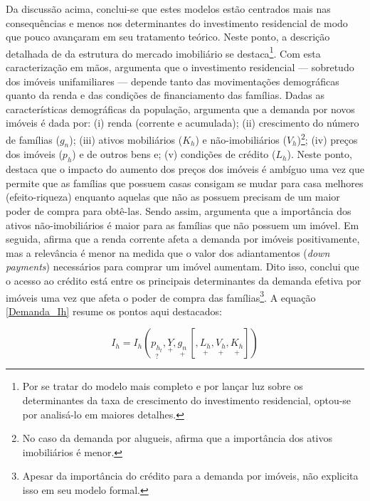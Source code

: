 Da discussão acima, 
conclui-se que estes modelos estão centrados mais nas consequências e menos nos determinantes do investimento residencial de modo que pouco avançaram em seu tratamento teórico.
Neste ponto, a descrição detalhada de \textcite{duesenberry_investment_1958} da estrutura do mercado imobiliário se destaca\footnote{
	Por se tratar do modelo mais completo e por lançar luz sobre os determinantes da taxa de crescimento do investimento residencial, optou-se por analisá-lo em maiores detalhes.
}.
Com esta caracterização em mãos, argumenta que o investimento residencial --- sobretudo dos imóveis unifamiliares --- depende tanto das movimentações demográficas quanto da renda e das condições de financiamento das famílias.
Dadas as características demográficas da população, argumenta que a demanda por novos imóveis é dada por:
	(i) renda (corrente e acumulada);
	(ii) crescimento do número de famílias ($g_n$);
	(iii) ativos mobiliários ($K_h$) e não-imobiliários ($V_h$)\footnote{No caso da demanda por alugueis, \textcite{duesenberry_investment_1958} afirma que a importância dos ativos imobiliários é menor.};
	(iv) preços dos imóveis ($p_h$) e de outros bens e;
	(v) condições de crédito ($L_h$).
Neste ponto, \textcite{duesenberry_investment_1958} destaca que o impacto do aumento dos preços dos imóveis é ambíguo uma vez que permite que as famílias que possuem casas consigam se mudar para casa melhores (efeito-riqueza) enquanto aquelas que não as possuem  precisam de um maior poder de compra para obtê-las.
Sendo assim, argumenta que a importância dos ativos não-imobiliários é maior para as famílias que não possuem um imóvel.
Em seguida, afirma que a renda corrente afeta a demanda por imóveis positivamente, mas a relevância é menor na medida que o valor dos adiantamentos (\textit{down payments}) necessários para comprar um imóvel aumentam.
Dito isso, conclui que o acesso ao crédito está entre os principais determinantes da demanda efetiva por imóveis uma vez que afeta o poder de compra das famílias\footnote{
Apesar da importância do crédito para a demanda por imóveis, \textcite{duesenberry_investment_1958} não explicita isso em seu modelo formal.
}.
A equação \ref{Demanda_Ih} resume os pontos aqui destacados:

\begin{equation}
\label{Demanda_Ih}
I_{h} = I_h(\underset{?}{p_{h_t}}, \underset{+}{Y}, \underset{+}{g_n}\, [, \underset{+}{L_h}, \underset{+}{V_h}, \underset{+}{K_h}])
\end{equation}

